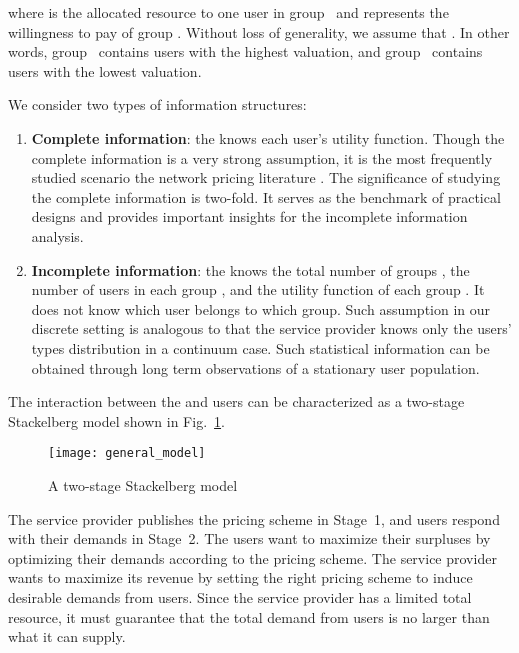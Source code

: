 \documentclass[twocolumn,10pt,twosided]{IEEEtran}
\begin{document}
where  is the allocated resource to one user in group~ and  represents the willingness to pay of group .  Without loss of generality, we assume that . In other words, group~ contains users with the highest valuation, and group~ contains users with the lowest valuation.

We consider two types of information structures:
\begin{enumerate}
    \item \textbf{Complete information}: the  knows each user's utility function.
 Though the complete information is a very strong assumption, it is the most frequently studied scenario the network pricing literature \cite{basar2002revenue,shen2007optimal,daoud2008stackelberg,jiang2008time, hande2010pricing, he2005pricing, shakkottai2006economics, voja}. The significance of studying the complete information is two-fold. It serves as the benchmark of practical designs and provides important insights for the incomplete information analysis.

	 \item \textbf{Incomplete information}: the  knows the total number of groups , the number of users in each group , and the utility function of each group . It does not know which user belongs to which group.
Such assumption in our discrete setting is analogous to that the service provider knows only the users' types distribution in a continuum case. Such statistical information can be obtained through long term observations of a stationary user population.
\end{enumerate}


The interaction between the  and users can be characterized as a two-stage Stackelberg model shown in Fig.~\ref{fig:model}.
\begin{figure}[ht]
\centering
\texttt{[image: general\_model]}
\caption{A two-stage Stackelberg model} \label{fig:model}
\end{figure}
The service provider publishes the pricing scheme in Stage~1, and users respond with their demands in Stage~2. The users want to maximize their surpluses by optimizing their demands according to the pricing scheme. The service provider wants to maximize its revenue by setting the right pricing scheme to induce desirable demands from users. Since the service provider has a limited total resource, it must guarantee that the total demand from users is no larger than what it can supply.
\end{document}
